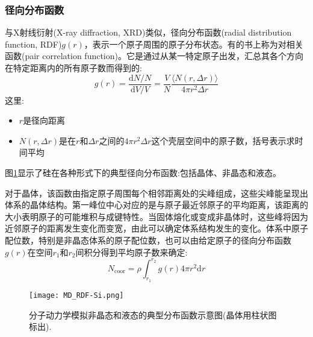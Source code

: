 \subsubsection{径向分布函数}
与\textrm{X}射线衍射\textrm{(X-ray diffraction, XRD)}类似，径向分布函数\textrm{(radial distribution function, RDF)}$g(r)$，表示一个原子周围的原子分布状态。有的书上称为对相关函数\textrm{(pair correlation function)}。它是通过从某一特定原子出发，汇总其各个方向在特定距离内的所有原子数而得到的:
\begin{equation}
	g(r)=\dfrac{\mathrm{d}N/N}{\mathrm{d}V/V}=\dfrac{V}{N}\dfrac{\langle N(r,\Delta r)\rangle}{4\pi r^2\Delta r}
	\label{eq:MD_RDF}
\end{equation}
这里:
\begin{itemize}
	\item $r$是径向距离
	\item $N(r,\Delta r)$是在$r$和$\Delta r$之间的$4\pi r^2\Delta r$这个壳层空间中的原子数，括号表示求时间平均
\end{itemize}
图\ref{MD_RDF-Si}显示了硅在各种形式下的典型径向分布函数:包括晶体、非晶态和液态。

对于晶体，该函数由指定原子周围每个相邻距离处的尖峰组成，这些尖峰能呈现出体系的晶体结构。第一峰位中心对应的是与原子最近邻原子的平均距离，该距离的大小表明原子的可能堆积与成键特性。当固体熔化或变成非晶体时，这些峰将因为近邻原子的距离发生变化而变宽，由此可以确定体系结构发生的变化。体系中原子配位数，特别是非晶态体系的原子配位数，也可以由给定原子的径向分布函数$g(r)$在空间$r_1$和$r_2$间积分得到平均原子数来确定:
\begin{equation}
	N_{\mathrm{coor}}=\rho\int_{r_1}^{r_2}g(r)4\pi r^2\mathrm{d}r
	\label{eq:MD-N-coop}
\end{equation}
\begin{figure}[h!]
\centering
\vspace*{-0.1in}
\texttt{[image: MD\_RDF-Si.png]}
\caption{{分子动力学模拟非晶态和液态的典型分布函数示意图(晶体用柱状图标出).}}%
\label{MD_RDF-Si}
\end{figure}

